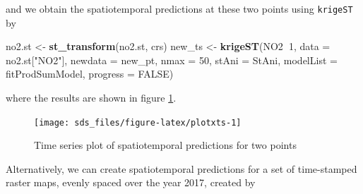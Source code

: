 \documentclass[]{book}
\newenvironment{Shaded}{\begin{snugshade}}{\end{snugshade}}
\newcommand{\DataTypeTok}[1]{\textcolor[rgb]{0.13,0.29,0.53}{#1}}
\newcommand{\DecValTok}[1]{\textcolor[rgb]{0.00,0.00,0.81}{#1}}
\newcommand{\FloatTok}[1]{\textcolor[rgb]{0.00,0.00,0.81}{#1}}
\newcommand{\KeywordTok}[1]{\textcolor[rgb]{0.13,0.29,0.53}{\textbf{#1}}}
\newcommand{\NormalTok}[1]{#1}
\newcommand{\OperatorTok}[1]{\textcolor[rgb]{0.81,0.36,0.00}{\textbf{#1}}}
\newcommand{\OtherTok}[1]{\textcolor[rgb]{0.56,0.35,0.01}{#1}}
\newcommand{\StringTok}[1]{\textcolor[rgb]{0.31,0.60,0.02}{#1}}
\begin{document}
and we obtain the spatiotemporal predictions at these two points using \texttt{krigeST} by

\begin{Shaded}
\begin{Highlighting}[]
\NormalTok{no2.st <-}\StringTok{ }\KeywordTok{st_transform}\NormalTok{(no2.st, crs)}
\NormalTok{new_ts <-}\StringTok{ }\KeywordTok{krigeST}\NormalTok{(NO2}\OperatorTok{~}\DecValTok{1}\NormalTok{, }\DataTypeTok{data =}\NormalTok{ no2.st[}\StringTok{"NO2"}\NormalTok{], }\DataTypeTok{newdata =}\NormalTok{ new_pt,}
         \DataTypeTok{nmax =} \DecValTok{50}\NormalTok{, }\DataTypeTok{stAni =}\NormalTok{ StAni, }\DataTypeTok{modelList =}\NormalTok{ fitProdSumModel,}
         \DataTypeTok{progress =} \OtherTok{FALSE}\NormalTok{)}
\end{Highlighting}
\end{Shaded}

where the results are shown in figure \ref{fig:plotxts}.

\begin{figure}

{\centering \texttt{[image: sds\_files/figure-latex/plotxts-1]} 

}

\caption{Time series plot of spatiotemporal predictions for two points}\label{fig:plotxts}
\end{figure}

Alternatively, we can create spatiotemporal predictions for a set of time-stamped
raster maps, evenly spaced over the year 2017, created by

\begin{Shaded}
\end{Shaded}
\end{document}
